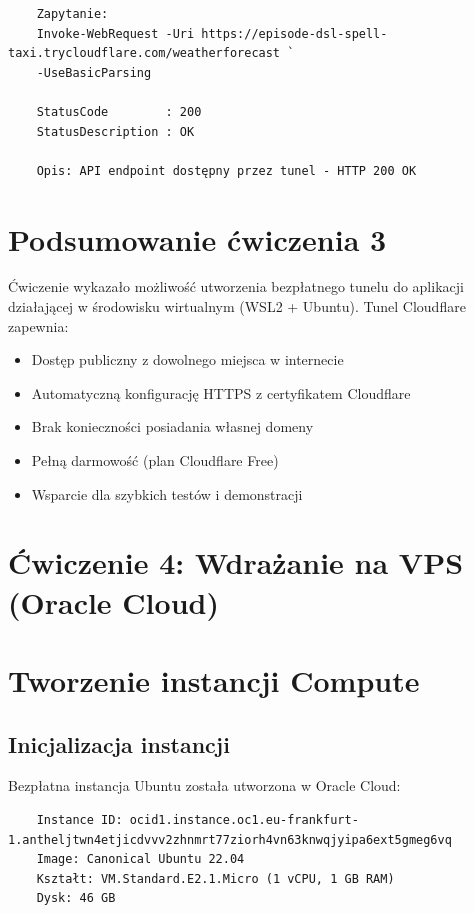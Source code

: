 \documentclass[twoside]{article}
\begin{document}
\begin{verbatim}
	Zapytanie:
	Invoke-WebRequest -Uri https://episode-dsl-spell-taxi.trycloudflare.com/weatherforecast `
	-UseBasicParsing
	
	StatusCode        : 200
	StatusDescription : OK
	
	Opis: API endpoint dostępny przez tunel - HTTP 200 OK
\end{verbatim}


\section{Podsumowanie ćwiczenia 3}

Ćwiczenie wykazało możliwość utworzenia bezpłatnego tunelu do aplikacji działającej w środowisku wirtualnym (WSL2 + Ubuntu). Tunel Cloudflare zapewnia:

\begin{itemize}
	\item Dostęp publiczny z dowolnego miejsca w internecie
	\item Automatyczną konfigurację HTTPS z certyfikatem Cloudflare
	\item Brak konieczności posiadania własnej domeny
	\item Pełną darmowość (plan Cloudflare Free)
	\item Wsparcie dla szybkich testów i demonstracji
\end{itemize}

\section{Ćwiczenie 4: Wdrażanie na VPS (Oracle Cloud)}



\section{Tworzenie instancji Compute}

\subsection{Inicjalizacja instancji}

Bezpłatna instancja Ubuntu została utworzona w Oracle Cloud:

\begin{verbatim}
	Instance ID: ocid1.instance.oc1.eu-frankfurt-1.antheljtwn4etjicdvvv2zhnmrt77ziorh4vn63knwqjyipa6ext5gmeg6vq
	Image: Canonical Ubuntu 22.04
	Kształt: VM.Standard.E2.1.Micro (1 vCPU, 1 GB RAM)
	Dysk: 46 GB
\end{verbatim}
\end{document}

